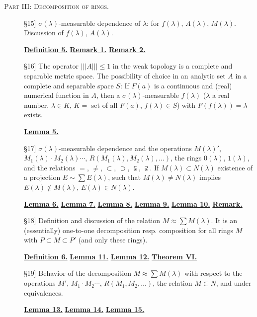 \documentclass[b5paper,12pt,twoside]{article}
\numberwithin{equation}{section}
\theoremstyle{vnplain}
\theoremstyle{vndefinition}
\newcommand{\tocsec}[1]{\hyperref[sec:#1]{\S#1}}
\newcommand{\tnormleft}{\lvert\lvert\lvert}
\newcommand{\tnormright}{\rvert\rvert\rvert}
\begin{document}
\noindent\textsc{Part III: Decomposition of rings.}
\begin{description}
\item[\tocsec{15}] $\sigma(\lambda)$-measurable dependence of
$\lambda$: for $f(\lambda)$, $A(\lambda)$, $M(\lambda)$. Discussion of
$f(\lambda)$, $A(\lambda)$.
\begin{center}\hyperref[def:5]{\textbf{Definition 5.}}\quad
\hyperref[rem:15.1]{\textbf{Remark 1.}}\quad
\hyperref[rem:15.2]{\textbf{Remark 2.}}\end{center}
\item[\tocsec{16}] The operator $\tnormleft A\tnormright\leq1$ in the weak
topology is a complete and separable metric space. The possibility of choice in
an analytic set $A$ in a complete and separable space $S$: If $F(a)$ is a
continuous and (real) numerical function in $A$, then a
$\sigma(\lambda)$-measurable $f(\lambda)$ ($\lambda$ a real number,
$\lambda\in K$, $K=$ set of all $F(a)$, $f(\lambda)\in S$) with
$F(f(\lambda))=\lambda$ exists.
\begin{center}\hyperref[lem:5]{\textbf{Lemma 5.}}\end{center}
\item[\tocsec{17}] $\sigma(\lambda)$-measurable dependence and the
operations $M(\lambda)'$, $M_1(\lambda)\cdot M_2(\lambda)\cdots$,
$R(M_1(\lambda),M_2(\lambda),\ldots)$, the rings $0(\lambda)$, $1(\lambda)$,
and the relations $=$, $\ne$, $\subset$, $\supset$, $\subsetneqq$,
$\supsetneqq$. If $M(\lambda)\subset N(\lambda)$ existence of a projection
$E\sim\sum E(\lambda)$, such that $M(\lambda)\ne N(\lambda)$ implies
$E(\lambda)\notin M(\lambda)$, $E(\lambda)\in N(\lambda)$.
\begin{center}\hyperref[lem:6]{\textbf{Lemma 6.}}\quad
\hyperref[lem:7]{\textbf{Lemma 7.}}\quad
\hyperref[lem:8]{\textbf{Lemma 8.}}\quad
\hyperref[lem:9]{\textbf{Lemma 9.}}\quad
\hyperref[lem:10]{\textbf{Lemma 10.}}\quad
\hyperref[rem:17]{\textbf{Remark.}}\end{center}
\item[\tocsec{18}] Definition and discussion of the relation
$M\approx\sum M(\lambda)$. It is an (essentially) one-to-one decomposition resp.
composition for all rings $M$ with $P\subset M\subset P'$ (and only these
rings).
\begin{center}\hyperref[def:6]{\textbf{Definition 6.}}\quad
\hyperref[lem:11]{\textbf{Lemma 11.}}\quad
\hyperref[lem:12]{\textbf{Lemma 12.}}\quad
\hyperref[thm:VI]{\textbf{Theorem VI.}}\end{center}
\item[\tocsec{19}] Behavior of the decomposition
$M\approx\sum M(\lambda)$ with respect to the operations $M'$, $M_1\cdot
M_2\cdots$, $R(M_1,M_2,\ldots)$, the relation $M\subset N$, and under
equivalences.
\begin{center}\hyperref[lem:13]{\textbf{Lemma 13.}}\quad
\hyperref[lem:14]{\textbf{Lemma 14.}}\quad
\hyperref[lem:15]{\textbf{Lemma 15.}}\end{center}
\end{description}
\end{document}
